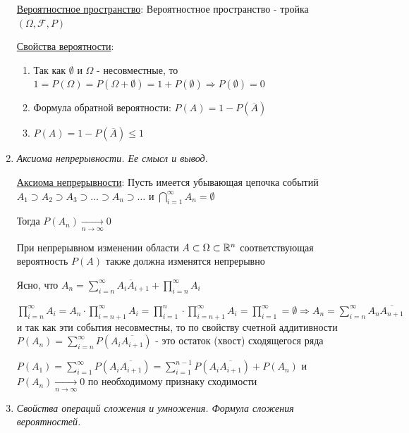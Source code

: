 \documentclass[12pt]{article}
\begin{document}
\begin{enumerate}
    \hyperlink{probabilityspace}{Вероятностное пространство}: Вероятностное пространство - тройка $(\Omega, \mathcal{F}, P)$

    \hyperlink{probabilityproperties}{Свойства вероятности}: 

    \begin{enumerate}
        \item Так как $\emptyset$ и $\Omega$ - несовместные, то $1 = P(\Omega) = P(\Omega + \emptyset) = 1 + P(\emptyset) \Longrightarrow P(\emptyset) = 0$

        \item Формула обратной вероятности: $P(A) = 1 - P(\overline{A})$

        \item $P(A) = 1 - P(\overline{A}) \leq 1$
    \end{enumerate}

    \item \textit{Аксиома непрерывности. Ее смысл и вывод.}

    \hyperlink{continuityaxiom}{Аксиома непрерывности}: \Ths Пусть имеется убывающая цепочка событий $A_1 \supset A_2 \supset A_3 \supset \dots \supset A_n \supset \dots$ и $\bigcap_{i = 1}^\infty A_n = \emptyset$

    Тогда $P(A_n) \underset{n \to \infty}{\to} 0$

    При непрерывном изменении области $A \subset \Omega \subset \mathbb{R}^n$ соответствующая вероятность $P(A)$ также должна изменятся непрерывно

    \begin{MyProof}
        Ясно, что $A_n = \sum_{i = n}^\infty A_i \overline{A}_{i + 1} + \prod_{i = n}^\infty A_i$

        $\prod_{i = n}^\infty A_i = A_n \cdot \prod_{i = n + 1}^\infty A_i = \prod_{i = 1}^n
        \cdot \prod_{i = n + 1}^\infty A_i = \prod_{i = 1}^\infty = \emptyset \Longrightarrow
        A_n = \sum_{i = n}^\infty A_n \overline{A_{n + 1}}$ и так как эти события несовместны,
        то по свойству счетной аддитивности $P(A_n) = \sum_{i = n}^\infty P(A_i \overline{A_{i + 1}})$ - это остаток (хвост) сходящегося ряда

        $P(A_1) = \sum_{i = 1}^\infty P(A_i \overline{A_{i + 1}}) = \sum_{i = 1}^{n - 1} P(A_i \overline{A_{i + 1}}) + P(A_n)$ и $P(A_n) \underset{n \to \infty}{\to} 0$ по необходимому признаку сходимости
    \end{MyProof}

    \item \textit{Свойства операций сложения и умножения. Формула сложения вероятностей.}


\end{enumerate}
\end{document}
